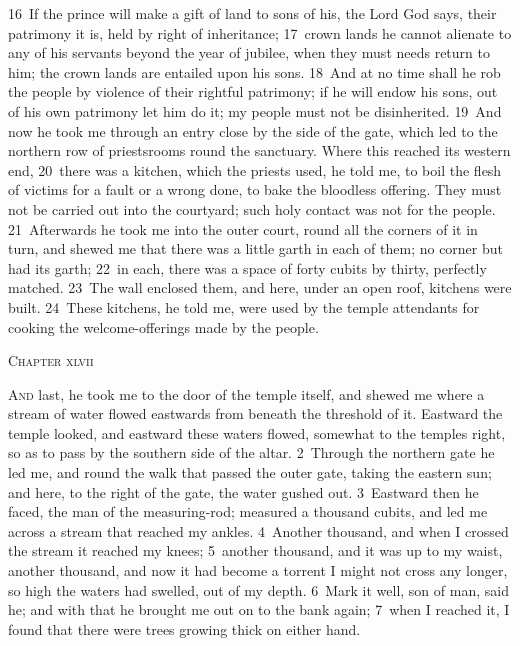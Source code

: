 \documentclass[10pt]{book} %
\begin{document}
\textcolor{benred8}{16}~If the prince will make a gift of land to sons of his, the Lord God says, their patrimony it is, held by right of inheritance; \textcolor{benred8}{17}~crown lands he cannot alienate to any of his servants beyond the year of jubilee, when they must needs return to him; the crown lands are entailed upon his sons. \textcolor{benred8}{18}~And at no time shall he rob the people by violence of their rightful patrimony; if he will endow his sons, out of his own patrimony let him do it; my people must not be disinherited.
\textcolor{benred8}{19}~And now he took me through an entry close by the side of the gate, which led to the northern row of priests\textquotesingle  rooms round the sanctuary. Where this reached its western end, \textcolor{benred8}{20}~there was a kitchen, which the priests used, he told me, to boil the flesh of victims for a fault or a wrong done, to bake the bloodless offering. They must not be carried out into the courtyard; such holy contact was not for the people. \textcolor{benred8}{21}~Afterwards he took me into the outer court, round all the corners of it in turn, and shewed me that there was a little garth in each of them; no corner but had its garth; \textcolor{benred8}{22}~in each, there was a space of forty cubits by thirty, perfectly matched. \textcolor{benred8}{23}~The wall enclosed them, and here, under an open roof, kitchens were built. \textcolor{benred8}{24}~These kitchens, he told me, were used by the temple attendants for cooking the welcome-offerings made by the people.
\begin{large}\begin{center}\textsc{Chapter xlvii}\end{center}\end{large}
\lettrine[lines=2]{A}{nd} last, he took me to the door of the temple itself, and shewed me where a stream of water flowed eastwards from beneath the threshold of it. Eastward the temple looked, and eastward these waters flowed, somewhat to the temple\textquotesingle s right, so as to pass by the southern side of the altar. \textcolor{benred8}{2}~Through the northern gate he led me, and round the walk that passed the outer gate, taking the eastern sun; and here, to the right of the gate, the water gushed out. \textcolor{benred8}{3}~Eastward then he faced, the man of the measuring-rod; measured a thousand cubits, and led me across a stream that reached my ankles. \textcolor{benred8}{4}~Another thousand, and when I crossed the stream it reached my knees; \textcolor{benred8}{5}~another thousand, and it was up to my waist, another thousand, and now it had become a torrent I might not cross any longer, so high the waters had swelled, out of my depth. \textcolor{benred8}{6}~Mark it well, son of man, said he; and with that he brought me out on to the bank again; \textcolor{benred8}{7}~when I reached it, I found that there were trees growing thick on either hand.
\end{document}
